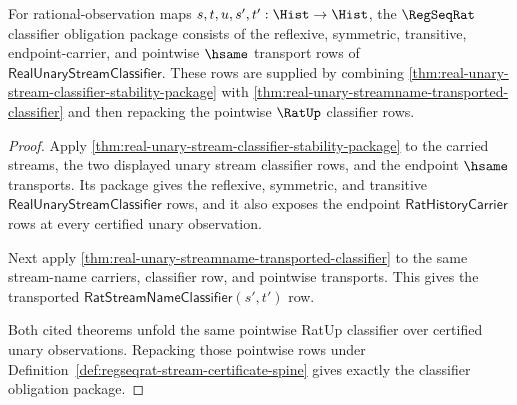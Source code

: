 \begin{theorem}
\label{thm:regseqrat-classifier-obligation-package}
For rational-observation maps $s,t,u,s',t':\Hist\to\Hist$, the
$\RegSeqRat$ classifier obligation package consists of the reflexive,
symmetric, transitive, endpoint-carrier, and pointwise $\hsame$ transport rows
of $\mathsf{RealUnaryStreamClassifier}$. These rows are supplied by combining
\autoref{thm:real-unary-stream-classifier-stability-package} with
\autoref{thm:real-unary-streamname-transported-classifier} and then repacking
the pointwise $\RatUp$ classifier rows.
\end{theorem}
\begin{proof}
Apply
\autoref{thm:real-unary-stream-classifier-stability-package} to the carried
streams, the two displayed unary stream classifier rows, and the endpoint
$\hsame$ transports. Its package gives the reflexive, symmetric, and
transitive $\mathsf{RealUnaryStreamClassifier}$ rows, and it also exposes the
endpoint $\mathsf{RatHistoryCarrier}$ rows at every certified unary
observation.

Next apply
\autoref{thm:real-unary-streamname-transported-classifier} to the same
stream-name carriers, classifier row, and pointwise transports. This gives the
transported $\mathsf{RatStreamNameClassifier}(s',t')$ row.

Both cited theorems unfold the same pointwise RatUp classifier over certified
unary observations. Repacking those pointwise rows under
Definition~\ref{def:regseqrat-stream-certificate-spine} gives exactly the
classifier obligation package.
\end{proof}

